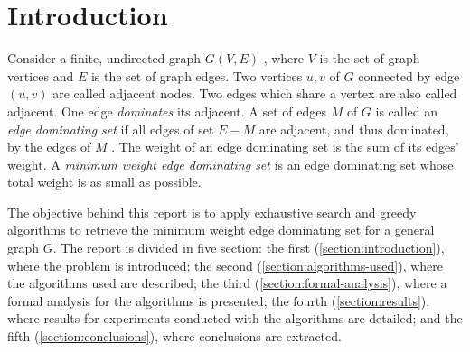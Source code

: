 \section{Introduction}\label{section:introduction}
Consider a finite, undirected graph $G(V,E)$ , where $V$ is the set of graph vertices and $E$ is the set of graph edges.
Two vertices $u, v$ of $G$ connected by edge $(u,v)$ are called adjacent nodes.
Two edges which share a vertex are also called adjacent.
One edge \emph{dominates} its adjacent.
A set of edges $M$ of $G$ is called an \emph{edge dominating set} if all edges of set $E - M$ are adjacent, and thus dominated, by the edges of $M$ \cite{dominating}.
The weight of an edge dominating set is the sum of its edges' weight. 
A \emph{minimum weight edge dominating set} is an edge dominating set whose total weight is as small as possible.

The objective behind this report is to apply exhaustive search and greedy algorithms to retrieve the minimum weight edge dominating set for a general graph $G$.
The report is divided in five section: the first (\autoref{section:introduction}), where the problem is introduced;
the second (\autoref{section:algorithms-used}), where the algorithms used are described;
the third (\autoref{section:formal-analysis}), where a formal analysis for the algorithms is presented;
the fourth (\autoref{section:results}), where results for experiments conducted with the algorithms are detailed;
and the fifth (\autoref{section:conclusions}), where conclusions are extracted.